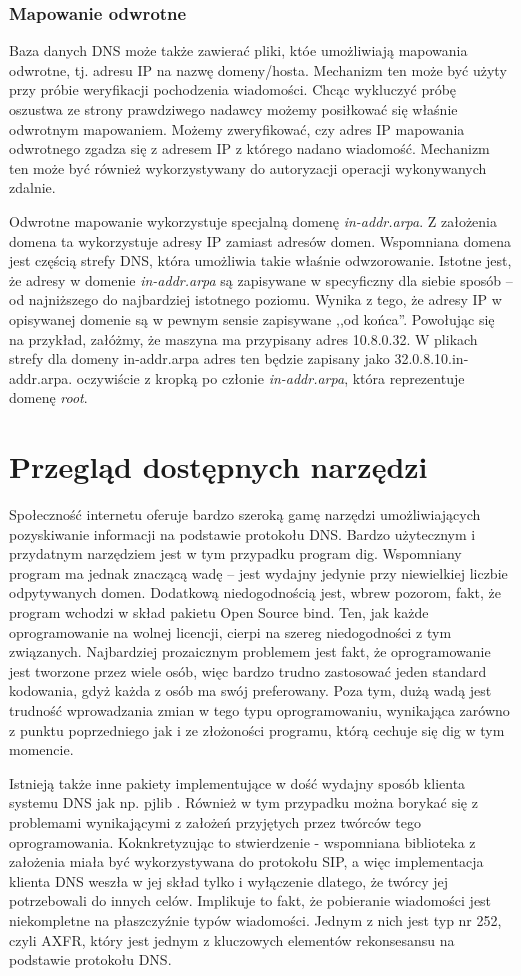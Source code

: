 \subsection{Mapowanie odwrotne}
Baza danych DNS może także zawierać pliki, któe umożliwiają mapowania odwrotne, tj. adresu IP na nazwę domeny/hosta. Mechanizm ten może być użyty przy próbie weryfikacji pochodzenia wiadomości. Chcąc wykluczyć próbę oszustwa ze strony prawdziwego nadawcy możemy posiłkować się właśnie odwrotnym mapowaniem. Możemy zweryfikować, czy adres IP mapowania odwrotnego zgadza się z adresem IP z którego nadano wiadomość. Mechanizm ten może być również wykorzystywany do autoryzacji operacji wykonywanych zdalnie. 

Odwrotne mapowanie wykorzystuje specjalną domenę \textit{in-addr.arpa}. Z założenia domena ta wykorzystuje adresy IP zamiast adresów domen.  Wspomniana domena jest częścią strefy DNS, która umożliwia takie właśnie odwzorowanie. Istotne jest, że adresy w domenie \textit{in-addr.arpa} są zapisywane w specyficzny dla siebie sposób -- od najniższego do najbardziej istotnego poziomu. Wynika z tego, że adresy IP w opisywanej domenie są w pewnym sensie zapisywane ,,od końca''. Powołując się na przykład, załóżmy, że maszyna ma przypisany adres 10.8.0.32. W plikach strefy dla domeny in-addr.arpa adres ten będzie zapisany jako 32.0.8.10.in-addr.arpa. oczywiście z kropką po członie \textit{in-addr.arpa}, która reprezentuje domenę \textit{root}.

\chapter{Przegląd dostępnych narzędzi}
Społeczność internetu oferuje bardzo szeroką gamę narzędzi umożliwiających pozyskiwanie informacji na podstawie protokołu DNS. Bardzo użytecznym i przydatnym narzędziem jest w tym przypadku program dig. Wspomniany program ma jednak znaczącą wadę -- jest wydajny jedynie przy niewielkiej liczbie odpytywanych domen. Dodatkową niedogodnością jest, wbrew pozorom, fakt, że program wchodzi w skład pakietu Open Source bind. Ten, jak każde oprogramowanie na wolnej licencji, cierpi na szereg niedogodności z tym związanych. Najbardziej prozaicznym problemem jest fakt, że oprogramowanie jest tworzone przez wiele osób, więc bardzo trudno zastosować jeden standard kodowania, gdyż każda z osób ma swój preferowany. Poza tym, dużą wadą jest trudność wprowadzania zmian w tego typu oprogramowaniu, wynikająca zarówno z punktu poprzedniego jak i ze złożoności programu, którą cechuje się dig w tym momencie.

Istnieją także inne pakiety implementujące w dość wydajny sposób klienta systemu DNS jak np. pjlib \cite{pjlib}. Również w tym przypadku można borykać się z problemami wynikającymi z założeń przyjętych przez twórców tego oprogramowania. Koknkretyzując to stwierdzenie - wspomniana biblioteka z założenia miała być wykorzystywana do protokołu SIP, a więc implementacja klienta DNS weszła w jej skład tylko i wyłączenie dlatego, że twórcy jej potrzebowali do innych celów. Implikuje to fakt, że pobieranie wiadomości jest niekompletne na płaszczyźnie typów wiadomości. Jednym z nich jest typ nr 252, czyli AXFR, który jest jednym z kluczowych elementów rekonsesansu na podstawie protokołu DNS.